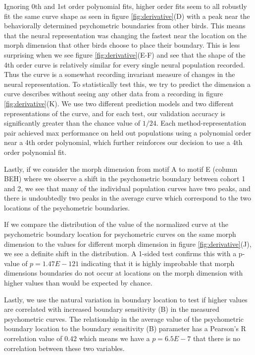 Ignoring 0th and 1st order polynomial fits, higher order fits seem to all robustly fit the same curve shape as seen in figure \ref{fig:derivative}(D) with a peak near the behaviorally determined psychometric boundaries from other birds. This means that the neural representation was changing the fastest near the location on the morph dimension that other birds choose to place their boundary. This is less surprising when we see figure \ref{fig:derivative}(E-F) and see that the shape of the 4th order \Thielk curve is relatively similar for every single neural population recorded. Thus the \Thielk curve is a somewhat recording invariant measure of changes in the neural representation. To statistically test this, we try to predict the dimension a \Thielk curve describes without seeing any other data from a recording in figure \ref{fig:derivative}(K). We use two different prediction models and two different representations of the \Thielk curve, and for each test, our validation accuracy is significantly greater than the chance value of $1/24$. Each method-representation pair achieved max performance on held out populations using a polynomial order near a 4th order polynomial, which further reinforces our decision to use a 4th order polynomial fit. 

Lastly, if we consider the morph dimension from motif A to motif E (column BEH) where we observe a shift in the psychometric boundary between cohort 1 and 2, we see that many of the individual population \Thielk curves have two peaks, and there is undoubtedly two peaks in the average \Thielk curve which correspond to the two locations of the psychometric boundaries.

If we compare the distribution of the value of the normalized \Thielk curve at the psychometric boundary location for psychometric curves on the same morph dimension to the values for different morph dimension in figure \ref{fig:derivative}(J), we see a definite shift in the distribution. A 1-sided \KS test confirms this with a p-value of $p=1.47E-121$ indicating that it is highly improbable that morph dimensions boundaries do not occur at locations on the morph dimension with higher \Thielk values than would be expected by chance.

Lastly, we use the natural variation in boundary location to test if higher \Thielk values are correlated with increased boundary sensitivity (B) in the measured psychometric curves. The relationship in the average \Thielk value of the psychometric boundary location to the boundary sensitivity (B) parameter has a Pearson's R correlation value of 0.42 which means we have a $p=6.5E-7$ that there is no correlation between these two variables.


